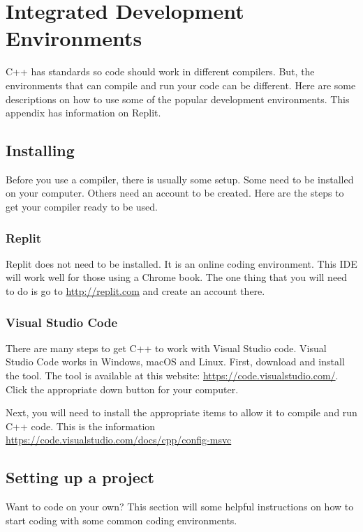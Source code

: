 

\chapter{Integrated Development Environments}
C++ has standards so code should work in different compilers. But, the 
environments that can compile and run your code can be different. Here
are some descriptions on how to use some of the popular development
environments. This appendix has information on Replit.
\section{Installing}
Before you use a compiler, there is usually some setup. Some need to
be installed on your computer. Others need an account to be created.
Here are the steps to get your compiler ready to be used.
\subsection{Replit}
Replit does not need to be installed. It is an online coding environment.
This IDE will work well for those using a Chrome book. The one thing that you will need to do is go to \url{http://replit.com} and create an 
account there.
\subsection{Visual Studio Code}
There are many steps to get C++ to work with Visual Studio code. Visual Studio Code works in Windows, macOS and Linux. First,
download and install the tool. The tool is available at this 
website: \url{https://code.visualstudio.com/}. Click the appropriate
down button for your computer.

Next, you will need to install the appropriate items to allow it
to compile and run C++ code. This is the information \url{https://code.visualstudio.com/docs/cpp/config-msvc }

\section{Setting up a project}
Want to code on your own? This section will some helpful instructions on
how to start coding with some common coding environments.
